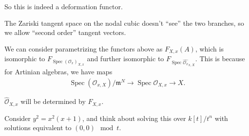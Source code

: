 \begin{center}
  \end{center}

So this is indeed a deformation functor.

\begin{description}
\tightlist
\item[Example (Motivating)]
The Zariski tangent space on the nodal cubic doesn't ``see'' the two
branches, so we allow ``second order'' tangent vectors.
\end{description}

We can consider parametrizing the functors above as \(F_{X, x}(A)\),
which is isomorphic to
\(F_{\operatorname{Spec}({\mathcal{O}}_x)_{X, x}}\) and further
isomorphic to
\(F_{\operatorname{Spec}\widehat{{\mathcal{O}}_x}_{x, X} }\). This is
because for Artinian algebras, we have maps
\begin{align*}
\operatorname{Spec}({\mathcal{O}}_{x, X})/{\mathfrak{m}}^N \to \operatorname{Spec}{\mathcal{O}}_{X, x} \to X
.\end{align*}

\begin{description}
\tightlist
\item[Remark]
\(\widehat{ {\mathcal{O}}}_{X, x}\) will be determined by \(F_{X, x}\).
\item[Example]
Consider \(y^2 = x^2(x+1)\), and think about solving this over
\(k[t]/t^n\) with solutions equivalent to \((0, 0) \mod t\).
\end{description}

